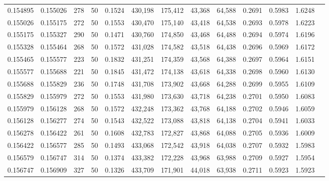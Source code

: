 \begin{tabular}{rrrrrrrrrrrrr}
0.154895 & 0.155026 &   278 &  50 &                                     0.1524 & 430,198 & 175,412 &  43,368 &  64,588 & 0.2691 & 0.5983 & 1.6248 \\
0.155026 & 0.155175 &   272 &  50 &                                     0.1553 & 430,470 & 175,140 &  43,418 &  64,538 & 0.2693 & 0.5978 & 1.6223 \\
0.155175 & 0.155327 &   290 &  50 &                                     0.1471 & 430,760 & 174,850 &  43,468 &  64,488 & 0.2694 & 0.5974 & 1.6196 \\
0.155328 & 0.155464 &   268 &  50 &                                     0.1572 & 431,028 & 174,582 &  43,518 &  64,438 & 0.2696 & 0.5969 & 1.6172 \\
0.155465 & 0.155577 &   223 &  50 &                                     0.1832 & 431,251 & 174,359 &  43,568 &  64,388 & 0.2697 & 0.5964 & 1.6151 \\
0.155577 & 0.155688 &   221 &  50 &                                     0.1845 & 431,472 & 174,138 &  43,618 &  64,338 & 0.2698 & 0.5960 & 1.6130 \\
0.155688 & 0.155829 &   236 &  50 &                                     0.1748 & 431,708 & 173,902 &  43,668 &  64,288 & 0.2699 & 0.5955 & 1.6109 \\
0.155829 & 0.155979 &   272 &  50 &                                     0.1553 & 431,980 & 173,630 &  43,718 &  64,238 & 0.2701 & 0.5950 & 1.6083 \\
0.155979 & 0.156128 &   268 &  50 &                                     0.1572 & 432,248 & 173,362 &  43,768 &  64,188 & 0.2702 & 0.5946 & 1.6059 \\
0.156128 & 0.156277 &   274 &  50 &                                     0.1543 & 432,522 & 173,088 &  43,818 &  64,138 & 0.2704 & 0.5941 & 1.6033 \\
0.156278 & 0.156422 &   261 &  50 &                                     0.1608 & 432,783 & 172,827 &  43,868 &  64,088 & 0.2705 & 0.5936 & 1.6009 \\
0.156422 & 0.156577 &   285 &  50 &                                     0.1493 & 433,068 & 172,542 &  43,918 &  64,038 & 0.2707 & 0.5932 & 1.5983 \\
0.156579 & 0.156747 &   314 &  50 &                                     0.1374 & 433,382 & 172,228 &  43,968 &  63,988 & 0.2709 & 0.5927 & 1.5954 \\
0.156747 & 0.156909 &   327 &  50 &                                     0.1326 & 433,709 & 171,901 &  44,018 &  63,938 & 0.2711 & 0.5923 & 1.5923 \\

\end{tabular}
